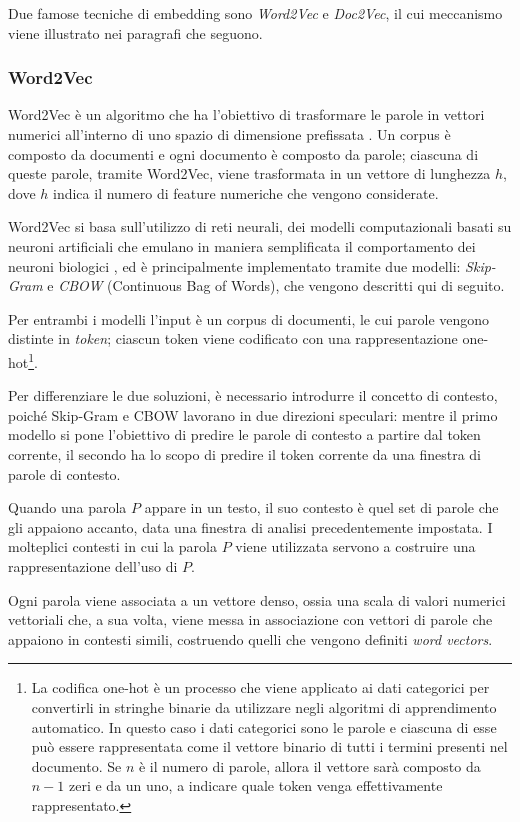 \documentclass[12pt]{report}
\theoremstyle{definition}
\begin{document}
Due famose tecniche di embedding sono \textit{Word2Vec} e \textit{Doc2Vec}, il cui meccanismo viene illustrato nei paragrafi che seguono.
\subsubsection{Word2Vec} \label{w2v}
Word2Vec è un algoritmo che ha l'obiettivo di trasformare le parole in vettori numerici all'interno di uno spazio  di dimensione prefissata \cite{3}.
Un corpus è composto da documenti e ogni documento è composto da parole; ciascuna di queste parole, tramite Word2Vec, viene trasformata in un vettore di lunghezza $h$, dove $h$ indica il numero di feature numeriche che vengono considerate. 

Word2Vec si basa sull'utilizzo di reti neurali, dei modelli computazionali basati su neuroni artificiali che emulano in maniera semplificata il comportamento dei neuroni biologici \cite{38}, ed è principalmente implementato tramite due modelli: \textit{Skip-Gram} e \textit{CBOW} (Continuous Bag of Words), che vengono descritti qui di seguito.

Per entrambi i modelli l'input è un corpus di documenti, le cui parole vengono distinte in \textit{token}; ciascun token viene codificato con una rappresentazione one-hot\footnote{La codifica one-hot è un processo che viene applicato ai dati categorici per convertirli in stringhe binarie da utilizzare negli algoritmi di apprendimento automatico. In questo caso i dati categorici sono le parole e ciascuna di esse può essere rappresentata come il vettore binario di tutti i termini presenti nel documento. Se $n$ è il numero di parole, allora il vettore sarà composto da $n-1$ zeri e da un uno, a indicare quale token venga effettivamente rappresentato.}.

Per differenziare le due soluzioni, è necessario introdurre il concetto di contesto, poiché Skip-Gram e CBOW lavorano in due direzioni speculari:
mentre il primo modello si pone l'obiettivo di predire le parole di contesto a partire dal token corrente, il secondo ha lo scopo di predire il token corrente da una finestra di parole di contesto.

Quando una parola $P$ appare in un testo, il suo contesto è quel set di parole che gli appaiono accanto, data una finestra di analisi precedentemente impostata. I molteplici contesti in cui la parola $P$ viene utilizzata servono a costruire una rappresentazione dell’uso di $P$.

Ogni parola viene associata a un vettore denso, ossia una scala di valori numerici vettoriali che, a sua volta, viene messa in associazione con vettori di parole che appaiono in contesti simili, costruendo quelli che vengono definiti \textit{word vectors}.
\end{document}

